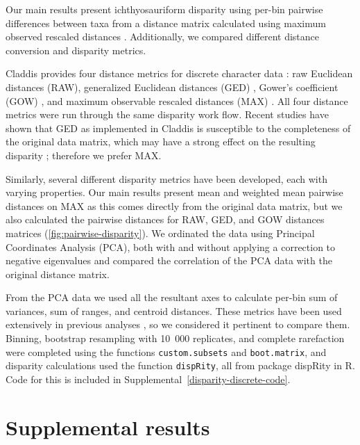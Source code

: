\documentclass[british,a4paper]{article}
\newcommand\pcref[1]{(\cref{#1})}
\begin{document}
Our main results present ichthyosauriform disparity using per-bin pairwise
differences between taxa from a distance matrix calculated using maximum
observed rescaled distances \autocite{Lloyd2016BJLS}. Additionally, we compared
different distance conversion and disparity metrics.

Claddis provides four distance metrics for discrete character data
\autocite{Lloyd2016BJLS}: raw Euclidean distances (RAW), generalized Euclidean
distances (GED) \autocite{Wills1994P}, Gower's coefficient (GOW)
\autocite{Gower1971B}, and maximum observable rescaled distances (MAX)
\autocite{Lloyd2016BJLS}. All four distance metrics were run through the same
disparity work flow. Recent studies have shown that GED as implemented in
Claddis is susceptible to the completeness of the original data matrix, which
may have a strong effect on the resulting disparity
\autocite{FlannerySutherland2019PRSBBS, Lehmann2019P}; therefore we prefer MAX\@.

Similarly, several different disparity metrics have been developed, each with
varying properties. Our main results present mean and weighted mean pairwise
distances on MAX as this comes directly from the original data matrix, but we
also calculated the pairwise distances for RAW, GED, and GOW distances matrices
\pcref{fig:pairwise-disparity}. We ordinated the data using Principal
Coordinates Analysis (PCA), both with and without applying a correction to
negative eigenvalues \autocite{Caillez1983P} and compared the correlation of the
PCA data with the original distance matrix. 

From the PCA data we used all the resultant axes to calculate per-bin sum of
variances, sum of ranges, and centroid distances. These metrics have been used
extensively in previous analyses \autocite{Wills1998BJLS, Thorne2011PNAS,
FlannerySutherland2019PRSBBS}, so we considered it pertinent to compare them.
Binning, bootstrap resampling with 10~000 replicates, and complete rarefaction
were completed using the functions \texttt{custom.subsets} and
\texttt{boot.matrix}, and disparity calculations used the function
\texttt{dispRity}, all from package dispRity \autocite{Guillerme2018MEE} in R.
Code for this is included in Supplemental~\ref{disparity-discrete-code}.


\section{Supplemental results}\label{sec:supplemental-results}
\end{document}
